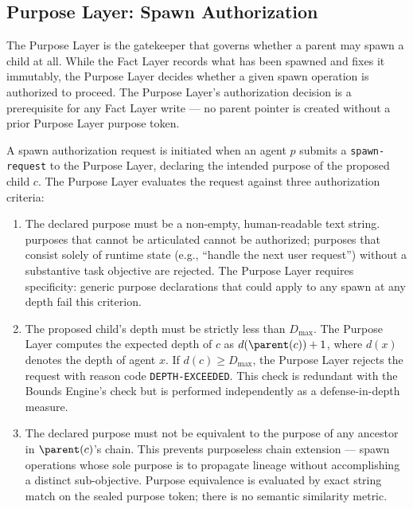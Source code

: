 \subsection{Purpose Layer: Spawn Authorization}
\label{sec:purpose-layer}

The Purpose Layer is the gatekeeper that governs whether a parent may spawn a child at all. While the Fact Layer records what has been spawned and fixes it immutably, the Purpose Layer decides whether a given spawn operation is authorized to proceed. The Purpose Layer's authorization decision is a prerequisite for any Fact Layer write — no parent pointer is created without a prior Purpose Layer purpose token.

A spawn authorization request is initiated when an agent $p$ submits a \texttt{spawn-request} to the Purpose Layer, declaring the intended purpose of the proposed child $c$. The Purpose Layer evaluates the request against three authorization criteria:

\begin{enumerate}
\item[\textbf{SA-1 — Legitimate Purpose:}] The declared purpose must be a non-empty, human-readable text string. purposes that cannot be articulated cannot be authorized; purposes that consist solely of runtime state (e.g., ``handle the next user request'') without a substantive task objective are rejected. The Purpose Layer requires specificity: generic purpose declarations that could apply to any spawn at any depth fail this criterion.

\item[\textbf{SA-2 — Depth Availability:}] The proposed child's depth must be strictly less than $D_{\max}$. The Purpose Layer computes the expected depth of $c$ as $d(\parent(c)) + 1$, where $d(x)$ denotes the depth of agent $x$. If $d(c) \geq D_{\max}$, the Purpose Layer rejects the request with reason code \texttt{DEPTH-EXCEEDED}. This check is redundant with the Bounds Engine's check but is performed independently as a defense-in-depth measure.

\item[\textbf{SA-3 — Non-circular Purpose:}] The declared purpose must not be equivalent to the purpose of any ancestor in $\parent(c)$'s chain. This prevents purposeless chain extension — spawn operations whose sole purpose is to propagate lineage without accomplishing a distinct sub-objective. Purpose equivalence is evaluated by exact string match on the sealed purpose token; there is no semantic similarity metric.
\end{enumerate}

